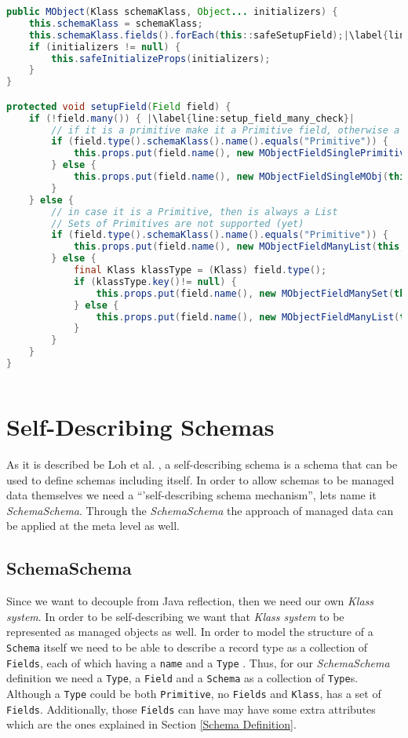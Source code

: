 \begin{sourcecode} [H]
	\begin{lstlisting}[language=Java, escapechar=|]
public MObject(Klass schemaKlass, Object... initializers) {
	this.schemaKlass = schemaKlass;
	this.schemaKlass.fields().forEach(this::safeSetupField);|\label{line:setup_fields}|
	if (initializers != null) {
		this.safeInitializeProps(initializers);
	}
}

protected void setupField(Field field) {
	if (!field.many()) { |\label{line:setup_field_many_check}|
		// if it is a primitive make it a Primitive field, otherwise a reference (managed object)
		if (field.type().schemaKlass().name().equals("Primitive")) {
			this.props.put(field.name(), new MObjectFieldSinglePrimitive(this, field));
		} else {
			this.props.put(field.name(), new MObjectFieldSingleMObj(this, field));
		}
	} else {
		// in case it is a Primitive, then is always a List
		// Sets of Primitives are not supported (yet)
		if (field.type().schemaKlass().name().equals("Primitive")) {
			this.props.put(field.name(), new MObjectFieldManyList(this, field));
		} else {
			final Klass klassType = (Klass) field.type();
			if (klassType.key()!= null) {
				this.props.put(field.name(), new MObjectFieldManySet(this, field));
			} else {
				this.props.put(field.name(), new MObjectFieldManyList(this, field));
			}
		}
	}
}
	\end{lstlisting}
	\caption{MObject: setup fields}
	\label{lst:setup_fields}
\end{sourcecode}

\section{Self-Describing Schemas}\label{Self-Describing Schemas}
As it is described be Loh et al. \cite{loh2012managed}, a self-describing schema is a schema that can be used to define schemas including itself.
In order to allow schemas to be managed data themselves we need a ``'self-describing schema mechanism'', lets name it \textit{SchemaSchema}.
Through the \textit{SchemaSchema} the approach of managed data can be applied at the meta level as well.

\subsection{SchemaSchema}\label{sec:SchemaSchema}
Since we want to decouple from Java reflection, then we need our own \textit{Klass system}. 
In order to be self-describing we want that \textit{Klass system} to be represented as managed objects as well. 
In order to model the structure of a \texttt{Schema} itself we need to be able to describe a record type as a collection of \texttt{Fields}, each of which having a \texttt{name} and a \texttt{Type} \cite{loh2012managed}. 
Thus, for our \textit{SchemaSchema} definition we need a \texttt{Type}, a \texttt{Field} and a \texttt{Schema} as a collection of \texttt{Type}s. 
Although a \texttt{Type} could be both \texttt{Primitive}, no \texttt{Fields} and \texttt{Klass}, has a set of \texttt{Fields}.
Additionally, those \texttt{Fields} can have may have some extra attributes which are the ones explained in Section \ref{Schema Definition}.

